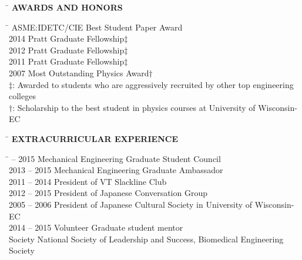 \documentclass[11pt,letter]{article}
\begin{document}
\begin{tabbing}
	\hspace{1cm}\=\kill
	\>  {\bf \Large AWARDS AND HONORS}
\end{tabbing}\vspace{-7mm}
\begin{tabbing}
	\hspace{1cm} \=  \> ASME:IDETC/CIE Best Student Paper Award\\
	2014 \> Pratt Graduate Fellowship$\ddagger$\\
	2012 \> Pratt Graduate Fellowship$\ddagger$\\
	2011 \> Pratt Graduate Fellowship$\ddagger$\\
	2007 \> Most Outstanding Physics Award$\dagger$\\
	\> 	$\ddagger$: Awarded to students who are aggressively recruited by other top engineering colleges\\
	 \> $\dagger$: Scholarship to the best student in physics courses at University of Wisconsin-EC\\
\end{tabbing}

\begin{tabbing}
	\hspace{1cm}\=\kill
	\>  {\bf \Large EXTRACURRICULAR EXPERIENCE}
\end{tabbing}\vspace{-7mm}
\begin{tabbing}
	\hspace{3cm} \=  -- 2015 \> Mechanical Engineering Graduate Student Council\\
	2013 -- 2015 \> Mechanical Engineering Graduate Ambassador\\
	2011 -- 2014 \> President of VT Slackline Club\\
	2012 -- 2015 \>	 President of Japanese Conversation Group\\
	2005 -- 2006\>	 President of Japanese Cultural Society in University of Wisconsin-EC\\
	2014 -- 2015 \> Volunteer  Graduate student mentor\\
	\> Society National Society of Leadership and Success, Biomedical Engineering Society
\end{tabbing}
\end{document}
